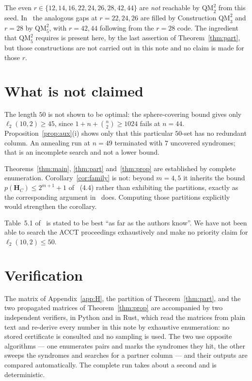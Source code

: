 \documentclass[11pt,a4paper]{article}
\theoremstyle{definition}
\theoremstyle{remark}
\newcommand{\HH}{\boldsymbol{H}}
\begin{document}
The even $r\in\{12,14,16,22,24,26,28,42,44\}$ are \emph{not} reachable by
$\mathrm{QM}_2^2$ from this seed. In~\cite{DMP2025} the analogous gaps at
$r=22,24,26$ are filled by Construction $\mathrm{QM}_3^2$ and $r=28$ by
$\mathrm{QM}_5^2$, with $r=42,44$ following from the $r=28$ code. The
ingredient that $\mathrm{QM}_5^2$ requires is present here, by the last
assertion of Theorem~\ref{thm:part}, but those constructions are not carried
out in this note and no claim is made for those $r$.

\section{What is not claimed}

The length $50$ is not shown to be optimal: the sphere-covering bound gives
only $\ell_2(10,2)\ge45$, since $1+n+\binom n2\ge1024$ fails at $n=44$.
Proposition~\ref{prop:aux}(i) shows only that this particular $50$-set has no
redundant column. An annealing run at $n=49$ terminated with $7$ uncovered
syndromes; that is an incomplete search and not a lower bound.

Theorems~\ref{thm:main}, \ref{thm:part} and~\ref{thm:prop} are established by
complete enumeration. Corollary~\ref{cor:family} is not: beyond $m=4,5$ it
inherits the bound $p(\HH_C)\le2^{m+1}+1$ of~\cite{DMP2025} (4.4) rather than
exhibiting the partitions, exactly as the corresponding argument
in~\cite{DMP2025} does. Computing those partitions explicitly would strengthen
the corollary.

Table~5.1 of~\cite{DMP2025} is stated to be best ``as far as the authors
know''. We have not been able to search the ACCT proceedings exhaustively and
make no priority claim for $\ell_2(10,2)\le50$.

\section*{Verification}

The matrix of Appendix~\ref{app:H}, the partition of Theorem~\ref{thm:part},
and the two propagated matrices of Theorem~\ref{thm:prop} are accompanied by
two independent verifiers, in Python and in Rust, which read the matrices from
plain text and re-derive every number in this note by exhaustive enumeration:
no stored certificate is consulted and no sampling is used. The two use
opposite algorithms --- one enumerates pairs and marks the syndromes they hit,
the other sweeps the syndromes and searches for a partner column --- and their
outputs are compared automatically. The complete run takes about a second and
is deterministic.
\end{document}
